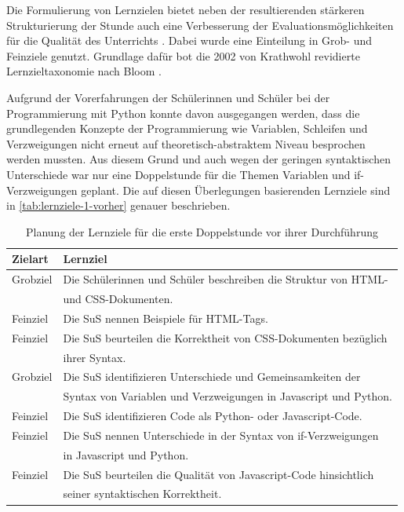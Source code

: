 Die Formulierung von Lernzielen bietet neben der resultierenden stärkeren Strukturierung der Stunde auch eine Verbesserung der Evaluationsmöglichkeiten für die Qualität des Unterrichts \cite[S.~19--21]{velica2010lernziele}.
Dabei wurde eine Einteilung in Grob- und Feinziele genutzt.
Grundlage dafür bot die 2002 von Krathwohl revidierte Lernzieltaxonomie nach Bloom \cite{krathwohl2002revision}.

Aufgrund der Vorerfahrungen der Schülerinnen und Schüler bei der Programmierung mit Python konnte davon ausgegangen werden, dass die grundlegenden Konzepte der Programmierung wie Variablen, Schleifen und Verzweigungen nicht erneut auf theoretisch-abstraktem Niveau besprochen werden mussten.
Aus diesem Grund und auch wegen der geringen syntaktischen Unterschiede war nur eine Doppelstunde für die Themen Variablen und if-Verzweigungen geplant.
Die auf diesen Überlegungen basierenden Lernziele sind in \autoref{tab:lernziele-1-vorher} genauer beschrieben.

\begin{table}[h!]
\begin{tabular*}{\linewidth}{l|l}
	\hline
	\textbf{Zielart} & \textbf{Lernziel}\\
	\hline \hline
	Grobziel & Die Schülerinnen und Schüler beschreiben die Struktur von HTML-\\
	& und CSS-Dokumenten.\\
	Feinziel & Die SuS nennen Beispiele für HTML-Tags.\\
	Feinziel & Die SuS beurteilen die Korrektheit von CSS-Dokumenten bezüglich\\
	& ihrer Syntax.\\
	\hline
	Grobziel & Die SuS identifizieren Unterschiede und Gemeinsamkeiten der\\
	& Syntax von Variablen und Verzweigungen in Javascript und Python.\\
	Feinziel & Die SuS identifizieren Code als Python- oder Javascript-Code.\\
	Feinziel & Die SuS nennen Unterschiede in der Syntax von if-Verzweigungen\\
	& in Javascript und Python.\\
	Feinziel & Die SuS beurteilen die Qualität von Javascript-Code hinsichtlich\\
	& seiner syntaktischen Korrektheit.\\
	\hline
\end{tabular*}
\caption{Planung der Lernziele für die erste Doppelstunde vor ihrer Durchführung}
\label{tab:lernziele-1-vorher}
\end{table}

